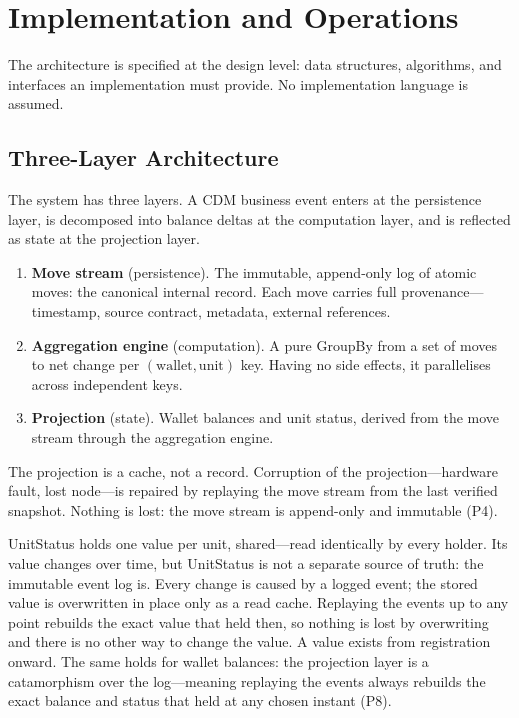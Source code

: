 \section{Implementation and Operations}
\label{sec:sec11}
\label{sec:implementation}

The architecture is specified at the design level: data structures, algorithms, and interfaces an implementation must provide. No implementation language is assumed.

\subsection{Three-Layer Architecture}
\label{sec:sec11-layers}

The system has three layers. A CDM business event enters at the persistence layer, is decomposed into balance deltas at the computation layer, and is reflected as state at the projection layer.

\begin{enumerate}[nosep]
\item \textbf{Move stream} (persistence). The immutable, append-only log of atomic moves: the canonical internal record. Each move carries full provenance---timestamp, source contract, metadata, external references.
\item \textbf{Aggregation engine} (computation). A pure GroupBy from a set of moves to net change per $(\text{wallet},\text{unit})$ key. Having no side effects, it parallelises across independent keys.
\item \textbf{Projection} (state). Wallet balances and unit status, derived from the move stream through the aggregation engine.
\end{enumerate}

The projection is a cache, not a record. Corruption of the projection---hardware fault, lost node---is repaired by replaying the move stream from the last verified snapshot. Nothing is lost: the move stream is append-only and immutable (P4).

\begin{remark}
UnitStatus holds one value per unit, shared---read identically by every holder. Its value changes over time, but UnitStatus is not a separate source of truth: the immutable event log is. Every change is caused by a logged event; the stored value is overwritten in place only as a read cache. Replaying the events up to any point rebuilds the exact value that held then, so nothing is lost by overwriting and there is no other way to change the value. A value exists from registration onward. The same holds for wallet balances: the projection layer is a catamorphism over the log---meaning replaying the events always rebuilds the exact balance and status that held at any chosen instant (P8).
\end{remark}

